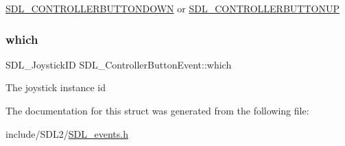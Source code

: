 \hyperlink{_s_d_l__events_8h_a3b589e89be6b35c02e0dd34a55f3fccaaafe044d5f92ac9608ded473218569474}{S\+D\+L\+\_\+\+C\+O\+N\+T\+R\+O\+L\+L\+E\+R\+B\+U\+T\+T\+O\+N\+D\+O\+WN} or \hyperlink{_s_d_l__events_8h_a3b589e89be6b35c02e0dd34a55f3fccaa8cb5a10b1ae0e185ef69a321d3d2d1be}{S\+D\+L\+\_\+\+C\+O\+N\+T\+R\+O\+L\+L\+E\+R\+B\+U\+T\+T\+O\+N\+UP} \mbox{\label{struct_s_d_l___controller_button_event_a98777e88b5d5cae83eef16ffd4bcacc1}} 
\subsubsection{\texorpdfstring{which}{which}}
{\footnotesize\ttfamily S\+D\+L\+\_\+\+Joystick\+ID S\+D\+L\+\_\+\+Controller\+Button\+Event\+::which}

The joystick instance id 

The documentation for this struct was generated from the following file\+:\begin{DoxyCompactItemize}
\item 
include/\+S\+D\+L2/\hyperlink{_s_d_l__events_8h}{S\+D\+L\+\_\+events.\+h}\end{DoxyCompactItemize}
